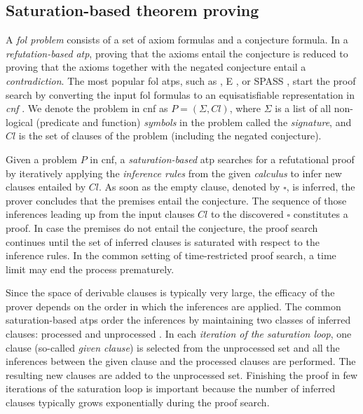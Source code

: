 
\subsection{Saturation-based theorem proving}
\label{sec:saturation}

A \emph{\acrfull{fol} problem} consists of a set of axiom formulas and a conjecture formula.
In a \emph{refutation-based} \emph{\acrfull{atp}},
proving that the axioms entail the conjecture
is reduced to proving that the axioms together with the negated conjecture entail a \emph{contradiction}.
The most popular \gls{fol} \glspl{atp}, such as \Vampire{} \cite{DBLP:conf/cav/KovacsV13}, E \cite{Schulz2019}, or SPASS \cite{DBLP:conf/cade/WeidenbachDFKSW09},
start the proof search by converting the input \gls{fol} formulas to an equisatisfiable representation in 
\emph{\acrfull{cnf}} \cite{DBLP:books/el/RV01/NonnengartW01,Harrison2009}.
We denote the problem in \gls{cnf} as $P = (\Sigma, \mathit{Cl})$,
where $\Sigma$ is a list of all non-logical (predicate and function)
\emph{symbols} in the problem called the \emph{signature},
and $\mathit{Cl}$ is the set of clauses of the problem (including the negated conjecture).

Given a problem $P$ in \gls{cnf},
a \emph{saturation-based} \gls{atp} searches for a refutational proof
by iteratively applying the \emph{inference rules} from the given \emph{calculus}
to infer new clauses entailed by $\mathit{Cl}$.
As soon as the empty clause, denoted by $\square$, is inferred,
the prover concludes that the premises entail the conjecture.
The sequence of those inferences leading up from the input clauses $\mathit{Cl}$ to the discovered $\square$ constitutes a proof.
In case the premises do not entail the conjecture,
the proof search continues until
the set of inferred clauses is saturated with respect to the inference rules.
In the common setting of time-restricted proof search, a time limit may end the process prematurely.

Since the space of derivable clauses is typically very large,
the efficacy of the prover depends on the order in which the inferences are applied.
The common saturation-based \glspl{atp} order the inferences
by maintaining two classes of inferred clauses: processed and unprocessed \cite{Schulz2019}.
In each \emph{iteration of the saturation loop}, one clause (so-called \emph{given clause})
is selected from the unprocessed set
and all the inferences between the given clause and the processed clauses are performed.
The resulting new clauses are added to the unprocessed set.
Finishing the proof in few iterations of the saturation loop is important
because the number of inferred clauses typically grows exponentially during the proof search.

